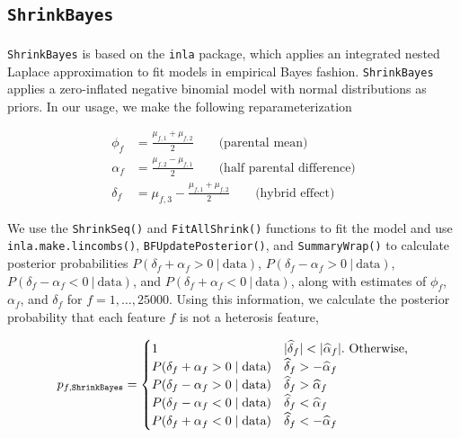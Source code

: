 \documentclass{article}
\providecommand{\wh}[1]{\widehat{#1}}
\begin{document}
\begin{flushleft}
\section{{\tt ShrinkBayes}}

\paragraph{} {\tt ShrinkBayes} is based on the {\tt inla} package, which applies an integrated nested Laplace approximation to fit models in empirical Bayes fashion. {\tt ShrinkBayes} applies a zero-inflated negative binomial model with normal distributions as priors. In our usage, we make the following reparameterization

\begin{align*}
\phi_f &= \frac{\mu_{f, 1} + \mu_{f, 2}}{2} \qquad \text{(parental mean)} \\
\alpha_f &= \frac{\mu_{f, 2} - \mu_{f, 1}}{2} \qquad \text{(half parental difference)} \\
\delta_f &= \mu_{f, 3} - \frac{\mu_{f, 1} + \mu_{f, 2}}{2} \qquad \text{(hybrid effect)} 
\end{align*}

We use the {\tt ShrinkSeq()} and {\tt FitAllShrink()} functions to fit the model and use {\tt inla.make.lincombs()}, {\tt BFUpdatePosterior()}, and {\tt SummaryWrap()} to calculate posterior probabilities $P(\delta_f + \alpha_f > 0 \ | \ \text{data})$, $P(\delta_f - \alpha_f > 0 \ | \ \text{data})$, $P(\delta_f - \alpha_f < 0 \ | \ \text{data})$, and $P(\delta_f + \alpha_f < 0 \ | \ \text{data})$, along with estimates of $\phi_f$, $\alpha_f$, and $\delta_f$ for $f = 1, \ldots, 25000$. Using this information, we calculate the posterior probability that each feature $f$ is not a heterosis feature,


\begin{align*}
p_{f, {\tt ShrinkBayes}} = \begin{cases}
1 & |\wh{\delta}_f| < |\wh{\alpha}_f|. \text{ Otherwise,} \\
P(\delta_f + \alpha_f > 0 \mid \text{data}) & \wh{\delta}_f > - \wh{\alpha}_f \\ 
P(\delta_f - \alpha_f > 0 \mid \text{data}) & \wh{\delta}_f > \wh{\alpha}_f \\ 
P(\delta_f - \alpha_f < 0 \mid \text{data}) & \wh{\delta}_f < \wh{\alpha}_f \\ 
P(\delta_f + \alpha_f < 0 \mid \text{data}) & \wh{\delta}_f < - \wh{\alpha}_f \\ 
\end{cases}
\end{align*}


\end{flushleft}
\end{document}
